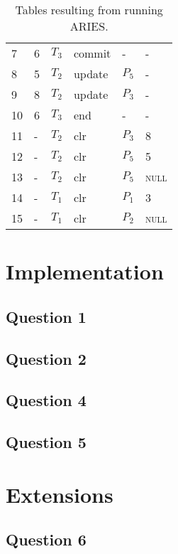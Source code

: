 \documentclass[a4paper]{article}
\newcommand{\mynull}{\textsc{null}}
\begin{document}
\begin{table}[h]
{\begin{tabular}{l|l|l|l|l|l}
            7 & 6 & $T_3$ & commit & - & - \\
            8 & 5 & $T_2$ & update & $P_5$ & - \\
            9 & 8 & $T_2$ & update & $P_3$ & - \\
            10 & 6 & $T_3$ & end & - & - \\
            11 & - & $T_2$ & clr & $P_3$ & 8 \\
            12 & - & $T_2$ & clr & $P_5$ & 5 \\
            13 & - & $T_2$ & clr & $P_5$ & \mynull \\
            14 & - & $T_1$ & clr & $P_1$ & 3 \\
            15 & - & $T_1$ & clr & $P_2$ & \mynull \\
            \bottomrule
        \end{tabular}
    }
    \caption{Tables resulting from running ARIES.}
\end{table}

\section{Implementation}

\subsection{Question 1}
\subsection{Question 2}
\subsection{Question 4}
\subsection{Question 5}

\section{Extensions}

\subsection{Question 6}
\end{document}
